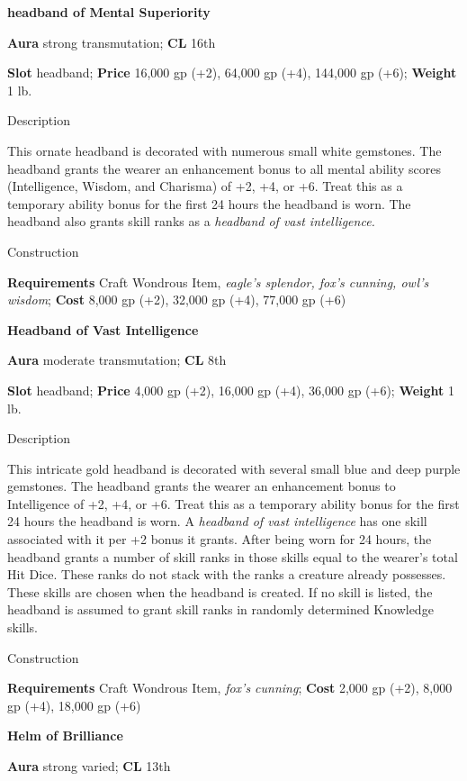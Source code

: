 \textbf{headband of Mental Superiority}
				
\textbf{Aura} strong transmutation; \textbf{CL} 16th
				
\textbf{Slot }headband; \textbf{Price} 16,000 gp (+2), 64,000 gp (+4), 144,000 gp (+6); \textbf{Weight} 1 lb.
				
Description
				
This ornate headband is decorated with numerous small white gemstones. The headband grants the wearer an enhancement bonus to all mental ability scores (Intelligence, Wisdom, and Charisma) of +2, +4, or +6. Treat this as a temporary ability bonus for the first 24 hours the headband is worn. The headband also grants skill ranks as a \textit{headband of vast intelligence.}
				
Construction
				
\textbf{Requirements} Craft Wondrous Item, \textit{eagle's splendor, fox's cunning, owl's wisdom}; \textbf{Cost} 8,000 gp (+2), 32,000 gp (+4), 77,000 gp (+6) 
				
\textbf{Headband of Vast Intelligence}
				
\textbf{Aura} moderate transmutation; \textbf{CL} 8th
				
\textbf{Slot }headband; \textbf{Price} 4,000 gp (+2), 16,000 gp (+4), 36,000 gp (+6); \textbf{Weight} 1 lb.
				
Description
				
This intricate gold headband is decorated with several small blue and deep purple gemstones. The headband grants the wearer an enhancement bonus to Intelligence of +2, +4, or +6. Treat this as a temporary ability bonus for the first 24 hours the headband is worn. A \textit{headband of vast intelligence }has one skill associated with it per +2 bonus it grants. After being worn for 24 hours, the headband grants a number of skill ranks in those skills equal to the wearer's total Hit Dice. These ranks do not stack with the ranks a creature already possesses. These skills are chosen when the headband is created. If no skill is listed, the headband is assumed to grant skill ranks in randomly determined Knowledge skills.
				
Construction
				
\textbf{Requirements }Craft Wondrous Item, \textit{fox's cunning}; \textbf{Cost} 2,000 gp (+2), 8,000 gp (+4), 18,000 gp (+6)
				
\textbf{Helm of Brilliance}
				
\textbf{Aura} strong varied;\textbf{ CL }13th
				
